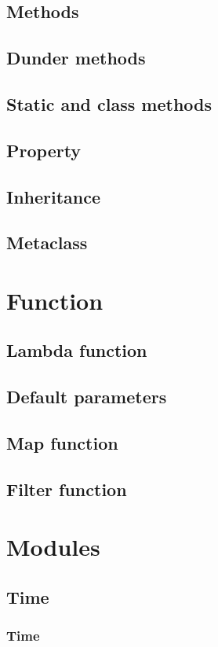 \documentclass{article}
\begin{document}
\subsection{Methods}
\subsection{Dunder methods}
\subsection{Static and class methods}
\subsection{Property}
\subsection{Inheritance}
\subsection{Metaclass}

\newpage
\section{Function}
\subsection{Lambda function}
\subsection{Default parameters}
\subsection{Map function}
\subsection{Filter function}

\newpage
\section{Modules}
\subsection{Time}
\subsubsection{Time}
\end{document}
